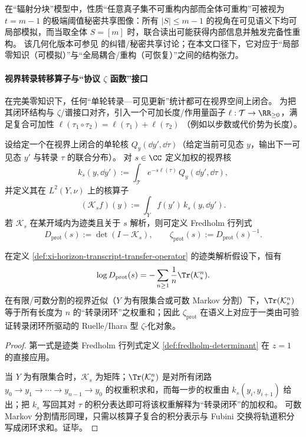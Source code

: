 \begin{remark}\label{rem:xi-threshold-zk-secret-sharing}
在“辐射分块”模型中，性质“任意真子集不可重构内部而全体可重构”可被视为 \(t=m-1\) 的极端阈值秘密共享图像：所有 \(|S|\le m-1\) 的视角在可见语义下均可局部模拟，而当取全体 \(S=[m]\) 时，联合读出可能获得内部信息并触发完备性重构。
该几何化版本可参见 \cite{BalasubramanianEtAl2021SecretSharing} 的纠错/秘密共享讨论；在本文口径下，它对应于“局部零知识（可模拟）”与“全局耦合/重构（可恢复）”之间的结构张力。
\end{remark}

\paragraph{视界转录转移算子与“协议 \texorpdfstring{$\zeta$}{zeta} 函数”接口}
在完美零知识下，任何“单轮转录—可见更新”统计都可在视界空间上闭合。
为把其闭环结构与 \(\zeta\)/谱接口对齐，引入一个可加长度/作用量函子 \(\ell:\mathcal{T}\to\RR_{\ge 0}\)，满足复合可加性
\(
\ell(\tau_1\circ\tau_2)=\ell(\tau_1)+\ell(\tau_2)
\)
（例如以步数或代价势为长度）。

\begin{definition}[视界转录转移算子族与协议行列式]\label{def:xi-horizon-transcript-transfer-operator}
设给定一个在视界上闭合的单轮核 \(Q_y(\dd y',\dd\tau)\)（给定当前可见态 \(y\)，输出下一可见态 \(y'\) 与转录 \(\tau\) 的联合分布）。
对 \(s\in\CC\) 定义加权的视界核
\[
k_s(y,\dd y')
:=
\int_{\mathcal{T}} e^{-s\ell(\tau)}\,Q_y(\dd y',\dd\tau),
\]
并定义其在 \(L^2(Y,\nu)\) 上的核算子
\[
(\mathcal{K}_s f)(y):=\int_Y f(y')\,k_s(y,\dd y').
\]
若 \(\mathcal{K}_s\) 在某开域内为迹类且关于 \(s\) 解析，则可定义 Fredholm 行列式
\[
D_{\mathrm{prot}}(s):=\det(I-\mathcal{K}_s),
\qquad
\zeta_{\mathrm{prot}}(s):=D_{\mathrm{prot}}(s)^{-1}.
\]
\end{definition}

\begin{proposition}[闭环展开恒等式与闭路权重和]\label{prop:xi-horizon-protocol-zeta-loop-expansion}
在定义 \ref{def:xi-horizon-transcript-transfer-operator} 的迹类解析假设下，恒有
\[
\log D_{\mathrm{prot}}(s)=-\sum_{n\ge 1}\frac{1}{n}\Tr(\mathcal{K}_s^{n}).
\]
在有限/可数分割的视界近似（\(Y\) 为有限集合或可数 Markov 分割）下，\(\Tr(\mathcal{K}_s^{n})\) 等于所有长度为 \(n\) 的“转录闭环”之权重和；因此 \(\zeta_{\mathrm{prot}}\) 在语义上对应于一类由可验证转录闭环所驱动的 Ruelle/Ihara 型 \(\zeta\)-化对象。
\end{proposition}

\begin{proof}
第一式是迹类 Fredholm 行列式定义 \ref{def:fredholm-determinant} 在 \(z=1\) 的直接应用。
\par
当 \(Y\) 为有限集合时，\(\mathcal{K}_s\) 为矩阵；\(\Tr(\mathcal{K}_s^{n})\) 是对所有闭路
\(
y_0\to y_1\to\cdots\to y_{n-1}\to y_0
\)
的权重积求和，而每一步的权重由 \(k_s(y_i,y_{i+1})\) 给出；把 \(k_s\) 写回其对 \(\tau\) 的积分表达即可将该权重解释为“转录闭环”的加权和。
可数 Markov 分割情形同理，只需以核算子复合的积分表示与 Fubini 交换将轨道积分写成闭环求和。证毕。
\end{proof}

